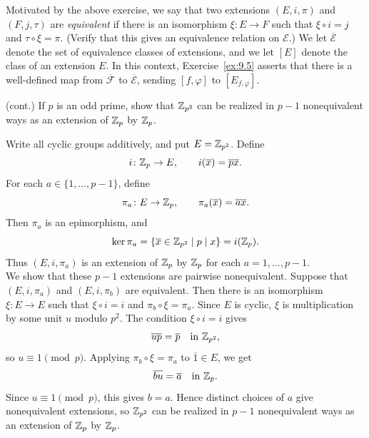 \documentclass[../Odyssey_Project.tex]{subfiles}
\begin{document}
Motivated by the above exercise, we say that two extensions $(E, i, \pi)$ and $(F, j, \tau)$ are \emph{equivalent} if there is an isomorphism $\xi: E \to F$ such that $\xi \circ i = j$ and $\tau \circ \xi = \pi$. (Verify that this gives an equivalence relation on $\mathcal{E}$.) We let $\overline{\mathcal{E}}$ denote the set of equivalence classes of extensions, and we let $[E]$ denote the class of an extension $E$. In this context, Exercise~\ref{ex:9.5} asserts that there is a well-defined map from $\overline{\mathcal{F}}$ to $\overline{\mathcal{E}}$, sending $[f, \varphi]$ to $[E_{f, \varphi}]$.

\begin{exercise}
\label{ex:9.6}
(cont.) If $p$ is an odd prime, show that $\mathbb{Z}_{p^2}$ can be realized in $p - 1$ nonequivalent ways as an extension of $\mathbb{Z}_p$ by $\mathbb{Z}_p$.
\end{exercise}
\begin{solution}
Write all cyclic groups additively, and put $E=\mathbb{Z}_{p^2}$. Define
\[
    i\colon \mathbb{Z}_p\to E,
    \qquad
    i(\overline{x})=\overline{px}.
\]
For each $a\in\{1,\ldots,p-1\}$, define
\[
    \pi_a\colon E\to \mathbb{Z}_p,
    \qquad
    \pi_a(\overline{x})=\overline{ax}.
\]
Then $\pi_a$ is an epimorphism, and
\[
    \ker \pi_a
    =
    \{\overline{x}\in \mathbb{Z}_{p^2}\mid p\mid x\}
    =
    i(\mathbb{Z}_p).
\]
Thus $(E,i,\pi_a)$ is an extension of $\mathbb{Z}_p$ by $\mathbb{Z}_p$ for each $a=1,\ldots,p-1$.\\
We show that these $p-1$ extensions are pairwise nonequivalent. Suppose that $(E,i,\pi_a)$ and $(E,i,\pi_b)$ are equivalent. Then there is an isomorphism $\xi\colon E\to E$ such that $\xi\circ i=i$ and $\pi_b\circ\xi=\pi_a$. Since $E$ is cyclic, $\xi$ is multiplication by some unit $u$ modulo $p^2$. The condition $\xi\circ i=i$ gives
\[
    \overline{up}=\overline{p}
    \quad\text{in }\mathbb{Z}_{p^2},
\]
so $u\equiv 1\pmod p$. Applying $\pi_b\circ\xi=\pi_a$ to $\overline{1}\in E$, we get
\[
    \overline{bu}
    =
    \overline{a}
    \quad\text{in }\mathbb{Z}_p.
\]
Since $u\equiv 1\pmod p$, this gives $b=a$. Hence distinct choices of $a$ give nonequivalent extensions, so $\mathbb{Z}_{p^2}$ can be realized in $p-1$ nonequivalent ways as an extension of $\mathbb{Z}_p$ by $\mathbb{Z}_p$.
\end{solution}
\end{document}

